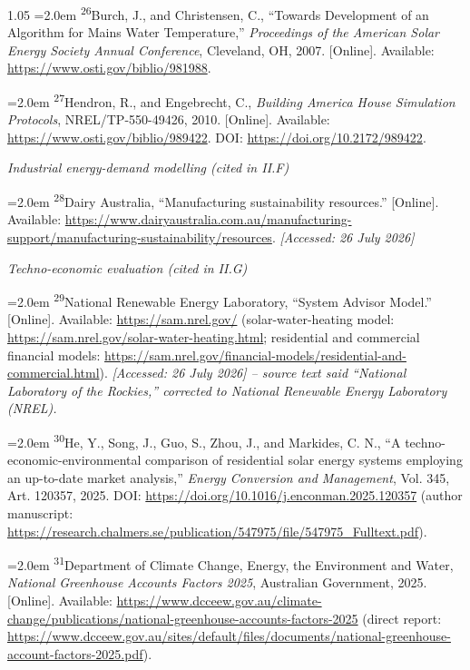 \documentclass[12pt,letterpaper]{article}
\DeclareRobustCommand{\refanchor}[1]{\hypertarget{ref:#1}{#1}} %
\newcommand{\referenceheading}[1]{\vspace{1.55em}\textit{#1}\par\vspace{0.45em}}
\newcommand{\refentry}[1]{\hangindent=2.0em\hangafter=1 #1\par\vspace{0.2em}}
\begin{document}
\begin{spacing}{1.05}
\refentry{
\textsuperscript{\refanchor{26}}Burch, J., and Christensen, C., ``Towards Development of an Algorithm for Mains Water Temperature,'' \textit{Proceedings of the American Solar Energy Society Annual Conference}, Cleveland, OH, 2007. [Online]. Available: \url{https://www.osti.gov/biblio/981988}.
}

\refentry{
\textsuperscript{\refanchor{27}}Hendron, R., and Engebrecht, C., \textit{Building America House Simulation Protocols}, NREL/TP-550-49426, 2010. [Online]. Available: \url{https://www.osti.gov/biblio/989422}. DOI: \url{https://doi.org/10.2172/989422}.
}

\referenceheading{Industrial energy-demand modelling (cited in II.F)}

\refentry{
\textsuperscript{\refanchor{28}}Dairy Australia, ``Manufacturing sustainability resources.'' [Online]. Available: \url{https://www.dairyaustralia.com.au/manufacturing-support/manufacturing-sustainability/resources}. \textit{[Accessed: 26 July 2026]}
}

\referenceheading{Techno-economic evaluation (cited in II.G)}

\refentry{
\textsuperscript{\refanchor{29}}National Renewable Energy Laboratory, ``System Advisor Model.'' [Online]. Available: \url{https://sam.nrel.gov/} (solar-water-heating model: \url{https://sam.nrel.gov/solar-water-heating.html}; residential and commercial financial models: \url{https://sam.nrel.gov/financial-models/residential-and-commercial.html}). \textit{[Accessed: 26 July 2026] -- source text said ``National Laboratory of the Rockies,'' corrected to National Renewable Energy Laboratory (NREL).}
}

\refentry{
\textsuperscript{\refanchor{30}}He, Y., Song, J., Guo, S., Zhou, J., and Markides, C. N., ``A techno-economic-environmental comparison of residential solar energy systems employing an up-to-date market analysis,'' \textit{Energy Conversion and Management}, Vol. 345, Art. 120357, 2025. DOI: \url{https://doi.org/10.1016/j.enconman.2025.120357} (author manuscript: \url{https://research.chalmers.se/publication/547975/file/547975_Fulltext.pdf}).
}

\refentry{
\textsuperscript{\refanchor{31}}Department of Climate Change, Energy, the Environment and Water, \textit{National Greenhouse Accounts Factors 2025}, Australian Government, 2025. [Online]. Available: \url{https://www.dcceew.gov.au/climate-change/publications/national-greenhouse-accounts-factors-2025} (direct report: \url{https://www.dcceew.gov.au/sites/default/files/documents/national-greenhouse-account-factors-2025.pdf}).
}


\end{spacing}
\end{document}
